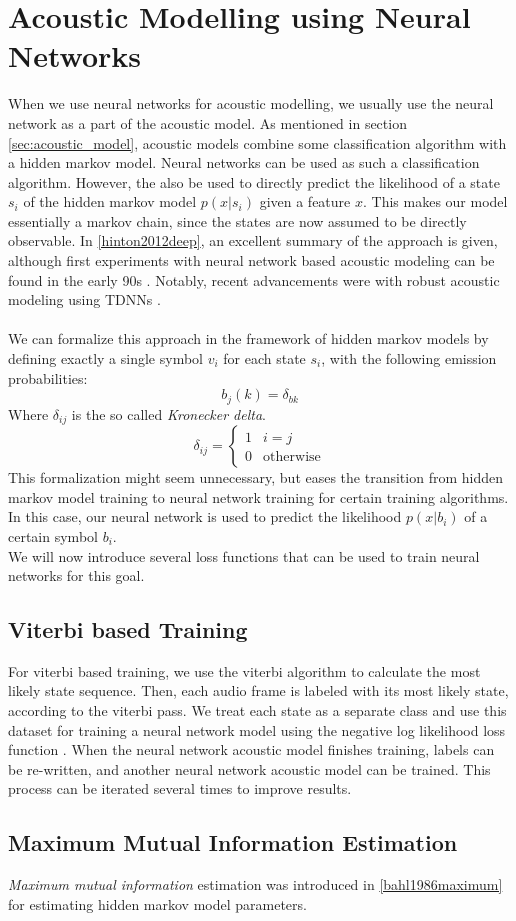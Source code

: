 \section{Acoustic Modelling using Neural Networks}

When we use neural networks for acoustic modelling, we usually use the neural network as a part of the acoustic model. As mentioned in section \ref{sec:acoustic_model}, acoustic models combine some classification algorithm with a hidden markov model. Neural networks can be used as such a classification algorithm. However, the also be used to directly predict the likelihood of a state $s_i$ of the hidden markov model $p(x|s_i)$ given a feature $x$. This makes our model essentially a markov chain, since the states are now assumed to be directly observable. In \ref{hinton2012deep}, an excellent summary of the approach is given, although first experiments with neural network based acoustic modeling can be found in the early 90s \cite{bengio1993connectionist}. Notably, recent advancements were with robust acoustic modeling using TDNNs \cite{peddinti2015jhu}. \\ \\
We can formalize this approach in the framework of hidden markov models by defining exactly a single symbol $v_i$ for each state $s_i$, with the following emission probabilities:
\[
b_j(k) = \delta_{bk}
\]
Where $\delta_{ij}$ is the so called \textit{Kronecker delta}.
\[
\delta_{ij} = \begin{cases}
1 & i = j\\
0 & \text{otherwise}
\end{cases} 
\]
This formalization might seem unnecessary, but eases the transition from hidden markov model training to neural network training for certain training algorithms. In this case, our neural network is used to predict the likelihood $p(x|b_i)$ of a certain symbol $b_i$.\\
We will now introduce several loss functions that can be used to train neural networks for this goal. 
\subsection{Viterbi based Training}
For viterbi based training, we use the viterbi algorithm to calculate the most likely state sequence. Then, each audio frame is labeled with its most likely state, according to the viterbi pass. We treat each state as a separate class and use this dataset for training a neural network model using the negative log likelihood loss function \cite{kitasr2018stueker}. When the neural network acoustic model finishes training, labels can be re-written, and another neural network acoustic model can be trained. This process can be iterated several times to improve results. 

\subsection{Maximum Mutual Information Estimation}
\textit{Maximum mutual information} estimation was introduced in \ref{bahl1986maximum} for estimating hidden markov model parameters. 


 